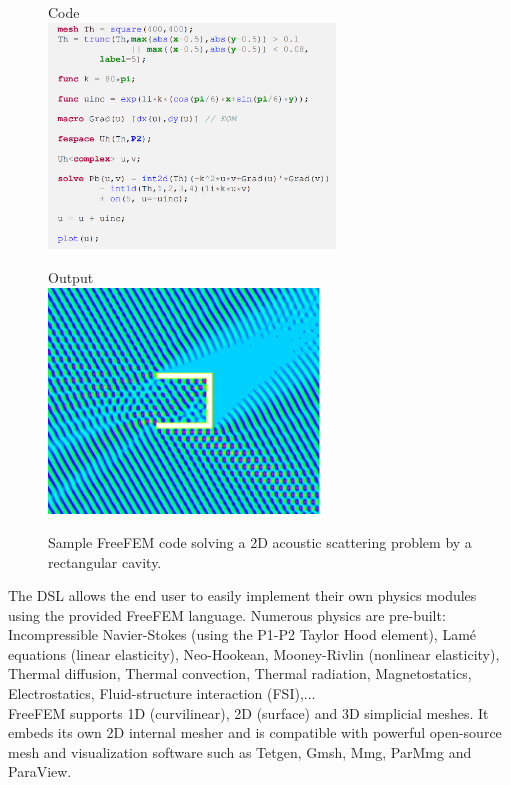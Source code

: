 \begin{figure}[ht!]
\begin{minipage}{.45\textwidth}
\begin{center}
Code\\[1em]

\includegraphics[height=6cm]{graphics/freefempp/samplecode.png}\end{center}
\end{minipage}
\hfill
\begin{minipage}{.45\textwidth}
\begin{center}
Output\\[1em]

\includegraphics[height=6cm]{graphics/freefempp/sampleplot.pdf}
\end{center}
\end{minipage}
\caption{Sample FreeFEM code solving a 2D acoustic scattering problem by a rectangular cavity.}
\end{figure}

The DSL allows the end user to easily implement their own physics modules using the provided FreeFEM language. Numerous physics are pre-built: Incompressible Navier-Stokes (using the P1-P2 Taylor Hood element), Lamé equations (linear elasticity), Neo-Hookean, Mooney-Rivlin (nonlinear elasticity), Thermal diffusion, Thermal convection, Thermal radiation, Magnetostatics, Electrostatics, Fluid-structure interaction (FSI),...\\
FreeFEM supports 1D (curvilinear), 2D (surface) and 3D simplicial meshes. It embeds its own 2D internal mesher and is compatible with powerful open-source mesh and visualization software such as Tetgen, Gmsh, Mmg, ParMmg and ParaView.\\

